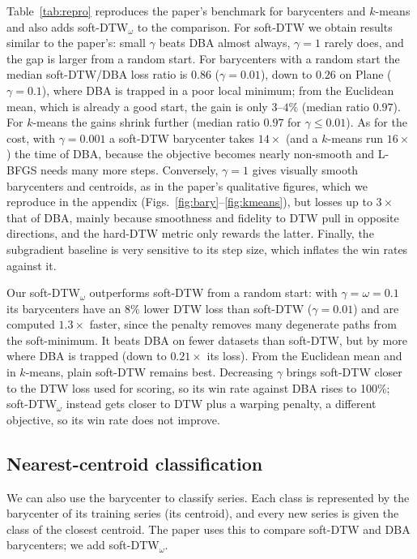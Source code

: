 \documentclass[11pt]{article}
\begin{document}
Table~\ref{tab:repro} reproduces the paper's benchmark for barycenters and $k$-means and also adds soft-DTW$_\omega$ to the comparison. For soft-DTW we obtain results similar to the paper's: small $\gamma$ beats DBA almost always, $\gamma=1$ rarely does, and the gap is larger from a random start. For barycenters with a random start the median soft-DTW/DBA loss ratio is $0.86$ ($\gamma=0.01$), down to $0.26$ on Plane ($\gamma=0.1$), where DBA is trapped in a poor local minimum; from the Euclidean mean, which is already a good start, the gain is only $3$--$4\%$ (median ratio $0.97$). For $k$-means the gains shrink further (median ratio $0.97$ for $\gamma\le0.01$). As for the cost, with $\gamma=0.001$ a soft-DTW barycenter takes $14\times$ (and a $k$-means run $16\times$) the time of DBA, because the objective becomes nearly non-smooth and L-BFGS needs many more steps. Conversely, $\gamma=1$ gives visually smooth barycenters and centroids, as in the paper's qualitative figures, which we reproduce in the appendix (Figs.~\ref{fig:bary}--\ref{fig:kmeans}), but losses up to $3\times$ that of DBA, mainly because smoothness and fidelity to DTW pull in opposite directions, and the hard-DTW metric only rewards the latter. Finally, the subgradient baseline is very sensitive to its step size, which inflates the win rates against it.

Our soft-DTW$_\omega$ outperforms soft-DTW from a random start: with $\gamma=\omega=0.1$ its barycenters have an $8\%$ lower DTW loss than soft-DTW ($\gamma=0.01$) and are computed $1.3\times$ faster, since the penalty removes many degenerate paths from the soft-minimum. It beats DBA on fewer datasets than soft-DTW, but by more where DBA is trapped (down to $0.21\times$ its loss). From the Euclidean mean and in $k$-means, plain soft-DTW remains best. Decreasing $\gamma$ brings soft-DTW closer to the DTW loss used for scoring, so its win rate against DBA rises to 100\%; soft-DTW$_\omega$ instead gets closer to DTW plus a warping penalty, a different objective, so its win rate does not improve.

\subsection{Nearest-centroid classification}
We can also use the barycenter to classify series. Each class is represented by the barycenter of its training series (its centroid), and every new series is given the class of the closest centroid. The paper uses this to compare soft-DTW and DBA barycenters; we add soft-DTW$_\omega$.
\end{document}
